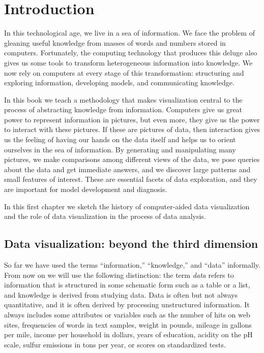 \mainmatter
\chapter[Introduction]{Introduction}\label{intro}

In this technological age, we live in a sea of information.  We face
the problem of gleaning useful knowledge from masses of words and
numbers stored in computers.  Fortunately, the computing technology
that produces this deluge also gives us some tools to transform
heterogeneous information into knowledge.  We now rely on computers at
every stage of this transformation: structuring and exploring
information, developing models, and communicating knowledge.  

In this book we teach a methodology that makes visualization central
to the process of abstracting knowledge from information.  Computers
give us great power to represent information in pictures, but even
more, they give us the power to interact with these pictures.  If
these are pictures of data, then interaction gives us the feeling of
having our hands on the data itself and helps us to orient ourselves
in the sea of information.  By generating and manipulating many
pictures, we make comparisons among different views of the data, we
pose queries about the data and get immediate answers, and we
discover large patterns and small features of interest.  These are
essential facets of data exploration, and they are important for
model development and diagnosis.

In this first chapter we sketch the history of computer-aided data
visualization and the role of data visualization in the process of
data analysis.


\section{Data visualization: beyond the third dimension}

 So far we have used
the terms ``information,'' ``knowledge,'' and ``data'' informally.
From now on we will use the following distinction: the term {\em data}
refers to information that is structured in some schematic form such
as a table or a list, and knowledge is derived from studying
data. Data is often but not always quantitative, and it is often
derived by processing unstructured information.  It always includes
some attributes or variables such as the number of hits on web sites,
frequencies of words in text samples, weight in pounds, mileage in
gallons per mile, income per household in dollars, years of education,
acidity on the pH scale, sulfur emissions in tons per year, or scores
on standardized tests.


